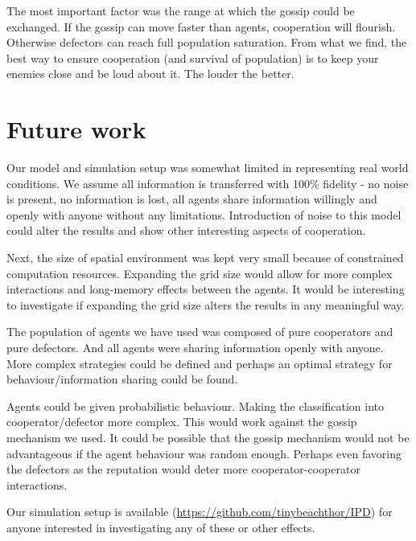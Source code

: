 \documentclass[english]{article}
\begin{document}
The most important factor was the range at which the gossip could be exchanged.
If the gossip can move faster than agents, cooperation will flourish.
Otherwise defectors can reach full population saturation.
From what we find, the best way to ensure cooperation (and survival of population) is to keep your enemies close and be loud about it. The louder the better.



\section{Future work}
Our model and simulation setup was somewhat limited in representing real world conditions.
We assume all information is transferred with 100\% fidelity - no noise is present, no information is lost, all agents share information willingly and openly with anyone without any limitations. Introduction of noise to this model could alter the results and show other interesting aspects of cooperation.

Next, the size of spatial environment was kept very small because of constrained computation resources. Expanding the grid size would allow for more complex interactions and long-memory effects between the agents.
It would be interesting to investigate if expanding the grid size alters the results in any meaningful way.

The population of agents we have used was composed of pure cooperators and pure defectors.
And all agents were sharing information openly with anyone.
More complex strategies could be defined and perhaps an optimal strategy for behaviour/information sharing could be found.

Agents could be given probabilistic behaviour. Making the classification into cooperator/defector more complex. This would work against the gossip mechanism we used.
It could be possible that the gossip mechanism would not be advantageous if the agent behaviour was random enough.
Perhaps even favoring the defectors as the reputation would deter more cooperator-cooperator interactions.

Our simulation setup is available
(\url{https://github.com/tinybeachthor/IPD})
for anyone interested in investigating any of these or other effects.



\pagebreak

\end{document}
